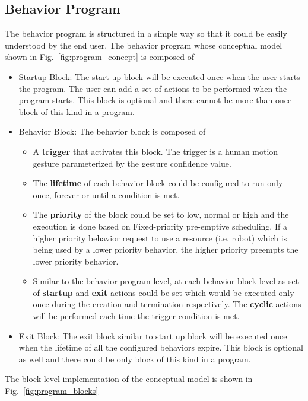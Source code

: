 \documentclass{llncs}
\begin{document}
\subsection{Behavior Program}
The behavior program is structured in a simple way so that it could be easily understood by the end user. The behavior program whose conceptual model shown in Fig.~\ref{fig:program_concept} is composed of
\begin{itemize}
\item Startup Block: The start up block will be executed once when the user starts the program. The user can add a set of actions to be performed when the program starts. This block is optional and there cannot be more than once block of this kind in a program.
\item Behavior Block: The behavior block is composed of
\begin{itemize}
\item A \textbf{trigger} that activates this block. The trigger is a human motion gesture parameterized by the gesture confidence value.
\item The \textbf{lifetime} of each behavior block could be configured to run only once, forever or until a condition is met. 
\item The \textbf{priority} of the block could be set to low, normal or high and the execution is done based on Fixed-priority pre-emptive scheduling. If a higher priority behavior request to use a resource (i.e. robot) which is being used by a lower priority behavior, the higher priority preempts the lower priority behavior.
\item Similar to the behavior program level, at each behavior block level as set of \textbf{startup} and \textbf{exit} actions could be set which would be executed only once during the creation and termination respectively. The \textbf{cyclic} actions will be performed each time the trigger condition is met.
\end{itemize}
\item Exit Block: The exit block similar to start up block will be executed once when the lifetime of all the configured behaviors expire. This block is optional as well and there could be only block of this kind in a program.
\end{itemize}
The block level implementation of the conceptual model is shown in Fig.~\ref{fig:program_blocks}
\end{document}
